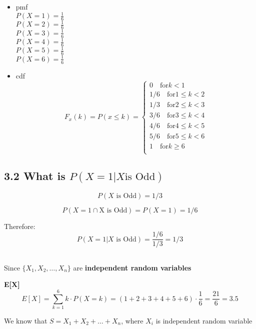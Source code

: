\documentclass[11pt]{article}
\begin{document}
\begin{itemize}
    \item pmf \\
   \( P(X = 1) = \frac{1}{6}\)\\
   \( P(X = 2) = \frac{1}{6}\)\\
   \( P(X = 3) = \frac{1}{6}\)\\
   \( P(X = 4) = \frac{1}{6}\)\\
   \( P(X = 5) = \frac{1}{6}\)\\
   \( P(X = 6) = \frac{1}{6}\)

   \item cdf
   \[
   F_{x}(k) = P(x \leq k) = 
   \begin{cases}
    0   \quad \text{for} k < 1\\
    1/6 \quad \text{for} 1 \leq k < 2 \\
    1/3 \quad \text{for} 2 \leq k < 3 \\ 
    3/6 \quad \text{for} 3 \leq k < 4 \\
    4/6 \quad \text{for} 4 \leq k < 5 \\
    5/6 \quad \text{for} 5 \leq k < 6 \\
    1   \quad \text{for} k \geq 6 \\
   \end{cases}
   \]
 
\end{itemize}






\subsection{3.2 What is \(P(X = 1 | X \text{is Odd})\)}
\[
P(X \text{ is Odd}) = 1/3 
\]

\[
P(X = 1 \cap \text{X is Odd}) = P(X = 1) = 1/6
\]

Therefore:
\[
P(X = 1 | X \text{ is Odd}) = \frac{1/6}{1/3} = 1/3
\]


\subsection{}


Since \(\{ X_1, X_2, \dots, X_n\}\) are \textbf{independent random variables}

\textbf{E[X]}
\[
E[X]=\sum_{k=1}^6 k \cdot P(X=k)=(1+2+3+4+5+6) \cdot \frac{1}{6}=\frac{21}{6}=3.5
\]


We know that \(S = X_1 + X_2 + \dots + X_n\), where \(X_i\) is independent random variable 
\end{document}
